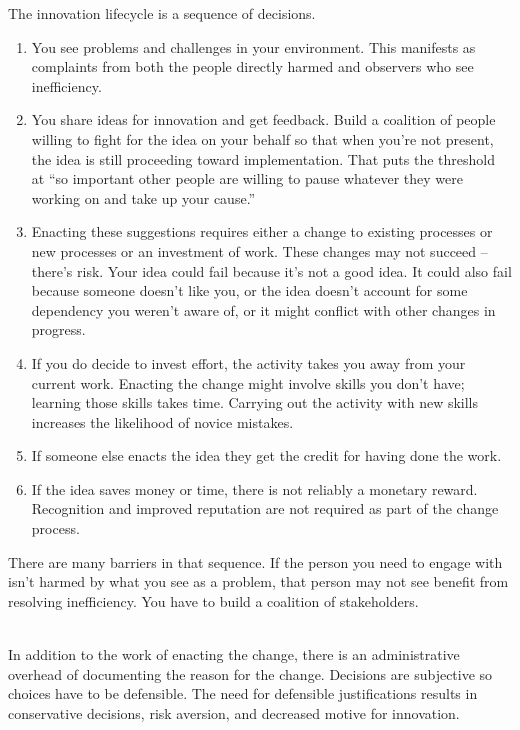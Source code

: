 The innovation lifecycle is a sequence of decisions.
\begin{enumerate}
    \item You see problems and challenges in your environment. This manifests as complaints from both the people directly harmed and observers who see inefficiency.
    \item You share ideas for innovation and get feedback. Build a coalition of people willing to fight for the idea on your behalf
%
%
    so that when you're not present, the idea is still proceeding toward implementation.  That puts the threshold at ``so important other people are willing to pause whatever they were working on and take up your cause.''
    \item Enacting these suggestions requires either a change to existing processes or new processes or an investment of work. These changes may not succeed -- there's risk. Your idea could fail because it's not a good idea. It could also fail because someone doesn't like you, or the idea doesn't account for some dependency you weren't aware of, or it might conflict with other changes in progress.
    \item If you do decide to invest effort, the activity takes you away from your current work. Enacting the change might involve skills you don't have; learning those skills takes time. Carrying out the activity with new skills increases the likelihood of novice mistakes.
    \item If someone else enacts the idea they get the credit for having done the work.
    \item If the idea saves money or time, there is not reliably a monetary reward. Recognition and improved reputation are not required as part of the change process. 
\end{enumerate}

There are many barriers in that sequence. 
If the person you need to engage with isn't harmed by what you see as a problem, that person may not see benefit from resolving inefficiency. You have to build a coalition of stakeholders.  

\ \\

In addition to the work of enacting the change, there is an administrative overhead of documenting the reason for the change. 
Decisions are subjective so choices have to be defensible. 
The need for defensible justifications results in conservative decisions, risk aversion, and decreased motive for innovation. 

